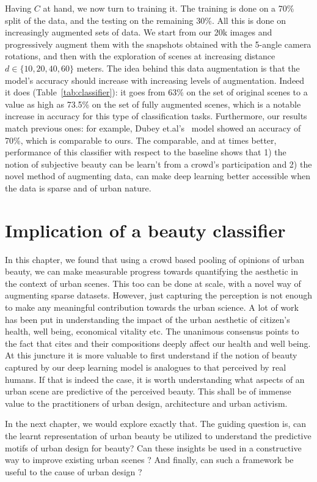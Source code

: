 Having $C$ at hand, we now turn to training it. The training is done on a 70\% split of the data, and the testing on the remaining 30\%. All this is done on increasingly augmented sets of data. We start from our 20k images and progressively augment them with  the snapshots obtained with the 5-angle camera rotations, and then with the exploration of scenes at increasing distance $d \in \{10,20,40,60\}$ meters. The idea behind this data augmentation is that the model's accuracy should increase with increasing levels of augmentation. Indeed it does (Table~\ref{tab:classifier}): it goes from 63\% on the set of original scenes to a value as high as  73.5\% on the set of fully augmented scenes, which is a notable increase in accuracy for this type of classification tasks. Furthermore, our results match previous ones: for example,  Dubey et.al's~\cite{dubey2016deep}  model showed an accuracy of 70\%, which is comparable to ours. 
The comparable, and at times better, performance of this classifier with respect to the baseline shows that 1) the notion of subjective beauty can be learn't from a crowd's participation and 2) the novel method of augmenting data, can make deep learning better accessible when the data is sparse and of urban nature.

\section{Implication of a beauty classifier}
In this chapter, we found that using a crowd based pooling of opinions of urban beauty, we can make measurable progress towards quantifying the aesthetic in the context of urban scenes. This too can be done at scale, with a novel way of augmenting sparse datasets. However, just capturing the perception is not enough to make any meaningful contribution towards the urban science. A lot of work has been put in understanding the impact of the urban aesthetic of citizen's health, well being, economical vitality etc. The unanimous consensus points to the fact that cites and their compositions deeply affect our health and well being. 
At this juncture it is more valuable to first understand if the notion of beauty captured by our deep learning model is analogues to that perceived by real humans. If that is indeed the case, it is worth understanding what aspects of an urban scene are predictive of the perceived beauty. This shall be of immense value to the practitioners of urban design, architecture and urban activism.

In the next chapter, we would explore exactly that. The guiding question is, can the learnt representation of urban beauty be utilized to understand the predictive motifs of urban design for beauty? Can these insights be used in a constructive way to improve existing urban scenes ? And finally, can such a framework be useful to the cause of urban design ? 


